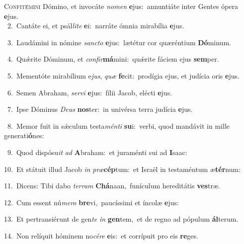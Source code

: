 \lettrine{\initial\textcolor{\initialcolor}{C}}{onfitémini} Dómino, et invocáte \textit{no}\-\textit{men} \textbf{e}\-jus:~\star annuntiáte inter Gentes ópera \textbf{e}\-jus.\\
{\numbfont\textcolor{\numbcolor}{~2.}}~Cantáte ei, et psál\-\textit{li}\-\textit{te} \textbf{e}\-i:~\star narráte ómnia mirabília \textbf{e}\-jus.\par
{\numbfont\textcolor{\numbcolor}{~3.}}~Laudámini in nómine \textit{sanc}\-\textit{to} \textbf{e}\-jus:~\star lætétur cor quæréntium \textbf{Dó}\-minum.\par
{\numbfont\textcolor{\numbcolor}{~4.}}~Quǽrite Dóminum, et \textit{con}\-\textit{fir}\textbf{má}mini:~\star quǽrite fáciem ejus \textbf{sem}\-per.\par
{\numbfont\textcolor{\numbcolor}{~5.}}~Mementóte mirabílium e\-\textit{jus}\-, \textit{quæ} \textbf{fe}\-cit:~\star prodígia ejus, et judícia oris \textbf{e}\-jus.\par
{\numbfont\textcolor{\numbcolor}{~6.}}~Semen Abraham, \textit{ser}\-\textit{vi} \textbf{e}\-jus:~\star fílii Jacob, elécti \textbf{e}\-jus.\par
{\numbfont\textcolor{\numbcolor}{~7.}}~Ipse Dóminus \textit{De}\-\textit{us} \textbf{nos}\-ter:~\star in univérsa terra judícia \textbf{e}\-jus.\par
{\numbfont\textcolor{\numbcolor}{~8.}}~Memor fuit in sǽculum testa\-\textit{mén}\-\textit{ti} \textbf{su}\-i:~\star verbi, quod mandávit in mille generati\-\textbf{ó}\-nes:\par
{\numbfont\textcolor{\numbcolor}{~9.}}~Quod dispósu\textit{it} \textit{ad} \textbf{A}\-braham:~\star et juraménti sui ad \textbf{I}\-saac:\par
{\numbfont\textcolor{\numbcolor}{10.}}~Et státuit illud Jacob \textit{in} \textit{præ}\-\textbf{cép}tum:~\star et Israël in testaméntum æ\-\textbf{tér}\-num:\par
{\numbfont\textcolor{\numbcolor}{11.}}~Dicens: Tibi dabo \textit{ter}\-\textit{ram} \textbf{Chá}\-naan,~\star funículum hereditátis \textbf{ves}\-træ.\par
{\numbfont\textcolor{\numbcolor}{12.}}~Cum essent nú\-\textit{me}\-\textit{ro} \textbf{bre}\-vi,~\star paucíssimi et íncolæ \textbf{e}\-jus:\par
{\numbfont\textcolor{\numbcolor}{13.}}~Et pertransiérunt de gen\textit{te} \textit{in} \textbf{gen}\-tem,~\star et de regno ad pópulum \textbf{ál}\-terum.\par
{\numbfont\textcolor{\numbcolor}{14.}}~Non relíquit hóminem no\-\textit{cé}\-\textit{re} \textbf{e}\-is:~\star et corrípuit pro eis \textbf{re}\-ges.\par
